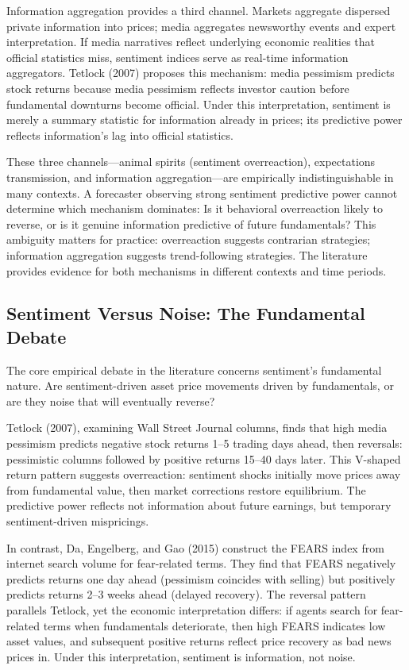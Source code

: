 \documentclass[11pt,twocolumn]{article}
\begin{document}
Information aggregation provides a third channel. Markets aggregate dispersed private information into prices; media aggregates newsworthy events and expert interpretation. If media narratives reflect underlying economic realities that official statistics miss, sentiment indices serve as real-time information aggregators. Tetlock (2007) proposes this mechanism: media pessimism predicts stock returns because media pessimism reflects investor caution before fundamental downturns become official. Under this interpretation, sentiment is merely a summary statistic for information already in prices; its predictive power reflects information's lag into official statistics.

These three channels---animal spirits (sentiment overreaction), expectations transmission, and information aggregation---are empirically indistinguishable in many contexts. A forecaster observing strong sentiment predictive power cannot determine which mechanism dominates: Is it behavioral overreaction likely to reverse, or is it genuine information predictive of future fundamentals? This ambiguity matters for practice: overreaction suggests contrarian strategies; information aggregation suggests trend-following strategies. The literature provides evidence for both mechanisms in different contexts and time periods.

\subsection{Sentiment Versus Noise: The Fundamental Debate}

The core empirical debate in the literature concerns sentiment's fundamental nature. Are sentiment-driven asset price movements driven by fundamentals, or are they noise that will eventually reverse?

Tetlock (2007), examining Wall Street Journal columns, finds that high media pessimism predicts negative stock returns 1--5 trading days ahead, then reversals: pessimistic columns followed by positive returns 15--40 days later. This V-shaped return pattern suggests overreaction: sentiment shocks initially move prices away from fundamental value, then market corrections restore equilibrium. The predictive power reflects not information about future earnings, but temporary sentiment-driven mispricings.

In contrast, Da, Engelberg, and Gao (2015) construct the FEARS index from internet search volume for fear-related terms. They find that FEARS negatively predicts returns one day ahead (pessimism coincides with selling) but positively predicts returns 2--3 weeks ahead (delayed recovery). The reversal pattern parallels Tetlock, yet the economic interpretation differs: if agents search for fear-related terms when fundamentals deteriorate, then high FEARS indicates low asset values, and subsequent positive returns reflect price recovery as bad news prices in. Under this interpretation, sentiment is information, not noise.
\end{document}
